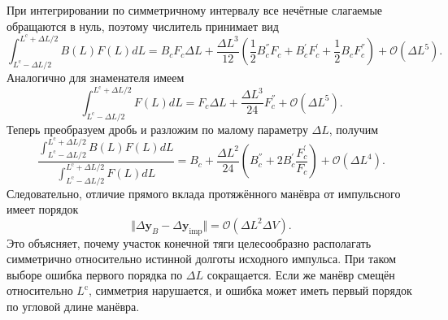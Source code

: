 При интегрировании по симметричному интервалу все нечётные слагаемые обращаются в нуль, поэтому числитель принимает вид
\begin{equation}
    \int_{L^\text{c} - \Delta L / 2}^{L^\text{c} + \Delta L / 2} B(L) F(L) dL = 
    B_c F_c \Delta L + \frac{\Delta L^3}{12} \left( \frac{1}{2} B_c^{''} F_c + B_c^{'} F_c^{'} + \frac{1}{2} B_c F_c^{''} \right) + \mathcal{O} (\Delta L^5).
\end{equation}
Аналогично для знаменателя имеем
\begin{equation}
    \int_{L^\text{c} - \Delta L / 2}^{L^\text{c} + \Delta L / 2} F(L) dL = 
    F_c \Delta L + \frac{\Delta L^3}{24} F_c^{''} + \mathcal{O} (\Delta L^5).
\end{equation}
Теперь преобразуем дробь и разложим по малому параметру $\Delta L$, получим
\begin{equation}
    \frac{\int_{L^\text{c} - \Delta L / 2}^{L^\text{c} + \Delta L / 2} B(L) F(L) dL}{\int_{L^\text{c} - \Delta L / 2}^{L^\text{c} + \Delta L / 2} F(L) dL} = 
    B_c + \frac{\Delta L^2}{24} \left( B_c^{''} + 2 B_c^{'} \frac{F_c^{'}}{F_c} \right) + \mathcal{O} (\Delta L^4).
\end{equation}
Следовательно, отличие прямого вклада протяжённого манёвра от импульсного имеет порядок
\begin{equation}
    \Vert \Delta \mathbf{y}_{B} - \Delta \mathbf{y}_{\text{imp}} \Vert = 
    \mathcal{O} (\Delta L^2 \Delta V ).
\end{equation}
Это объясняет, почему участок конечной тяги целесообразно располагать симметрично относительно истинной долготы исходного импульса. При таком выборе ошибка первого порядка по $\Delta L$ сокращается. Если же манёвр смещён относительно $L^\text{c}$, симметрия нарушается, и ошибка может иметь первый порядок по угловой длине манёвра.

